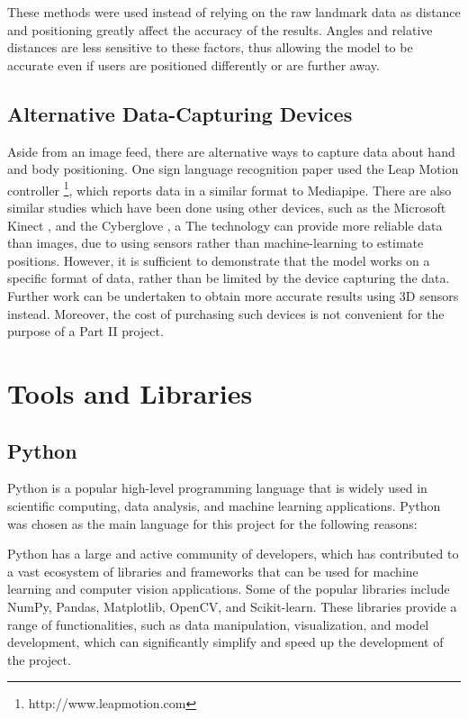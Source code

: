 \documentclass[final,rdr32.tex]{subfiles}
\begin{document}
These methods were used instead of relying on the raw landmark data as distance and positioning greatly affect the accuracy of the results. Angles and relative distances are less sensitive to these factors, thus allowing the model to be accurate even if users are positioned differently or are further away.

\subsection{Alternative Data-Capturing Devices}

Aside from an image feed, there are alternative ways to capture data about hand and body positioning. One sign language recognition paper \cite{chuan2014american} used the Leap Motion controller \footnote{http://www.leapmotion.com}, which reports data in a similar format to Mediapipe. There are also similar studies which have been done using other devices, such as the Microsoft Kinect \cite{lang2012sign}, and the Cyberglove \cite{wang2006american}, a The technology can provide more reliable data than images, due to using sensors rather than machine-learning to estimate positions. However, it is sufficient to demonstrate that the model works on a specific format of data, rather than be limited by the device capturing the data. Further work can be undertaken to obtain more accurate results using 3D sensors instead. Moreover, the cost of purchasing such devices is not convenient for the purpose of a Part II project.

\section{Tools and Libraries}

\subsection*{Python}

Python is a popular high-level programming language that is widely used in scientific computing, data analysis, and machine learning applications. Python was chosen as the main language for this project for the following reasons:

Python has a large and active community of developers, which has contributed to a vast ecosystem of libraries and frameworks that can be used for machine learning and computer vision applications. Some of the popular libraries include NumPy, Pandas, Matplotlib, OpenCV, and Scikit-learn. These libraries provide a range of functionalities, such as data manipulation, visualization, and model development, which can significantly simplify and speed up the development of the project.
\end{document}
